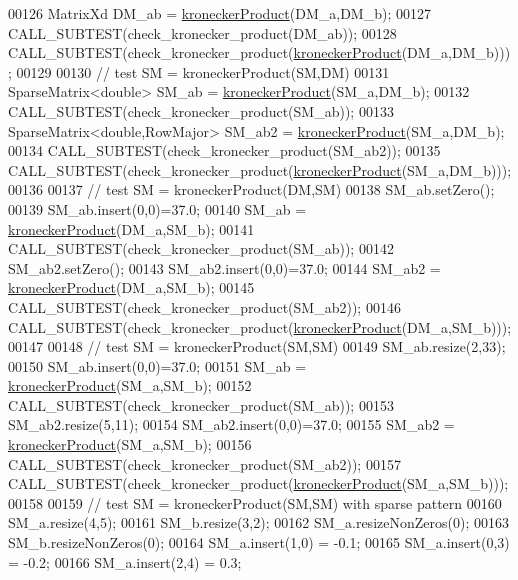 \begin{DoxyCode}
00126   MatrixXd DM\_ab = \hyperlink{namespace_eigen_aedd4b7cd1e324ed0769cac2701f4d050}{kroneckerProduct}(DM\_a,DM\_b);
00127   CALL\_SUBTEST(check\_kronecker\_product(DM\_ab));
00128   CALL\_SUBTEST(check\_kronecker\_product(\hyperlink{namespace_eigen_aedd4b7cd1e324ed0769cac2701f4d050}{kroneckerProduct}(DM\_a,DM\_b)));
00129 
00130   \textcolor{comment}{// test SM = kroneckerProduct(SM,DM)}
00131   SparseMatrix<double> SM\_ab = \hyperlink{namespace_eigen_aedd4b7cd1e324ed0769cac2701f4d050}{kroneckerProduct}(SM\_a,DM\_b);
00132   CALL\_SUBTEST(check\_kronecker\_product(SM\_ab));
00133   SparseMatrix<double,RowMajor> SM\_ab2 = \hyperlink{namespace_eigen_aedd4b7cd1e324ed0769cac2701f4d050}{kroneckerProduct}(SM\_a,DM\_b);
00134   CALL\_SUBTEST(check\_kronecker\_product(SM\_ab2));
00135   CALL\_SUBTEST(check\_kronecker\_product(\hyperlink{namespace_eigen_aedd4b7cd1e324ed0769cac2701f4d050}{kroneckerProduct}(SM\_a,DM\_b)));
00136 
00137   \textcolor{comment}{// test SM = kroneckerProduct(DM,SM)}
00138   SM\_ab.setZero();
00139   SM\_ab.insert(0,0)=37.0;
00140   SM\_ab = \hyperlink{namespace_eigen_aedd4b7cd1e324ed0769cac2701f4d050}{kroneckerProduct}(DM\_a,SM\_b);
00141   CALL\_SUBTEST(check\_kronecker\_product(SM\_ab));
00142   SM\_ab2.setZero();
00143   SM\_ab2.insert(0,0)=37.0;
00144   SM\_ab2 = \hyperlink{namespace_eigen_aedd4b7cd1e324ed0769cac2701f4d050}{kroneckerProduct}(DM\_a,SM\_b);
00145   CALL\_SUBTEST(check\_kronecker\_product(SM\_ab2));
00146   CALL\_SUBTEST(check\_kronecker\_product(\hyperlink{namespace_eigen_aedd4b7cd1e324ed0769cac2701f4d050}{kroneckerProduct}(DM\_a,SM\_b)));
00147 
00148   \textcolor{comment}{// test SM = kroneckerProduct(SM,SM)}
00149   SM\_ab.resize(2,33);
00150   SM\_ab.insert(0,0)=37.0;
00151   SM\_ab = \hyperlink{namespace_eigen_aedd4b7cd1e324ed0769cac2701f4d050}{kroneckerProduct}(SM\_a,SM\_b);
00152   CALL\_SUBTEST(check\_kronecker\_product(SM\_ab));
00153   SM\_ab2.resize(5,11);
00154   SM\_ab2.insert(0,0)=37.0;
00155   SM\_ab2 = \hyperlink{namespace_eigen_aedd4b7cd1e324ed0769cac2701f4d050}{kroneckerProduct}(SM\_a,SM\_b);
00156   CALL\_SUBTEST(check\_kronecker\_product(SM\_ab2));
00157   CALL\_SUBTEST(check\_kronecker\_product(\hyperlink{namespace_eigen_aedd4b7cd1e324ed0769cac2701f4d050}{kroneckerProduct}(SM\_a,SM\_b)));
00158 
00159   \textcolor{comment}{// test SM = kroneckerProduct(SM,SM) with sparse pattern}
00160   SM\_a.resize(4,5);
00161   SM\_b.resize(3,2);
00162   SM\_a.resizeNonZeros(0);
00163   SM\_b.resizeNonZeros(0);
00164   SM\_a.insert(1,0) = -0.1;
00165   SM\_a.insert(0,3) = -0.2;
00166   SM\_a.insert(2,4) =  0.3;

\end{DoxyCode}

